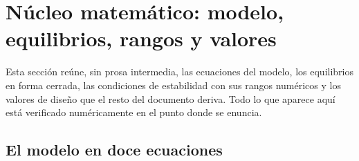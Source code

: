 \section{Núcleo matemático: modelo, equilibrios, rangos y valores}
\label{sec:nucleo}

Esta sección reúne, sin prosa intermedia, las ecuaciones del modelo, los
equilibrios en forma cerrada, las condiciones de estabilidad con sus rangos
numéricos y los valores de diseño que el resto del documento deriva. Todo lo que
aparece aquí está verificado numéricamente en el punto donde se enuncia.

\subsection{El modelo en doce ecuaciones}

